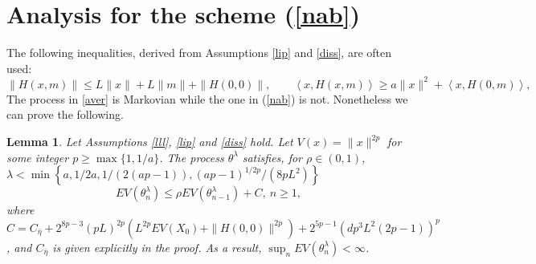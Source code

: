 \documentclass[a4paper]{article}
\newtheorem{lemma}[theorem]{Lemma}
\begin{document}
\section{Analysis for the scheme (\ref{nab})}\label{sec_nab}

The following inequalities, derived from Assumptions \ref{lip} and \ref{diss}, are often used:
\begin{equation}\label{es6}
\|H(x, m)\| \le L\|x\| + L\|m\| + \|H(0,0)\|, \qquad \left\langle x, H(x,m) \right\rangle \ge a \|x\|^2  + \left\langle x, H(0,m) \right\rangle,
\end{equation}
The process in \eqref{aver} is Markovian while the one in (\ref{nab}) is not. %
Nonetheless we can prove the following.

\begin{lemma}\label{dore}
Let Assumptions \ref{lll}, \ref{lip} and \ref{diss} hold. Let $V(x) = \|x\|^{2p}$ for some integer $p \ge \max\{1,1/a\}$. The process $\theta^{\lambda}$ satisfies,
for $\rho \in (0,1)$,  $\lambda < \min\left\{a,1/2a, 1/(2(ap -1)), (ap-1)^{1/2p}/(8pL^2) \right\}$%
	\begin{equation}\label{ly}
	EV(\theta^{\lambda}_n) \le \rho E V(\theta^{\lambda}_{n-1}) + C,\ n\geq 1,
	\end{equation}
	where $C =   C_{\bar{\eta} }+2^{8p-3}(pL)^{2p}(L^{2p}EV(X_0)+\|H(0,0)\|^{2p})+2^{5p-1}(dp^3L^2(2p-1))^p$,  and $C_{\bar{\eta} }$ is given explicitly in the proof. %
	 As a result, $\sup_{n} E V(\theta^{\lambda}_n) < \infty$.
\end{lemma}
\end{document}
